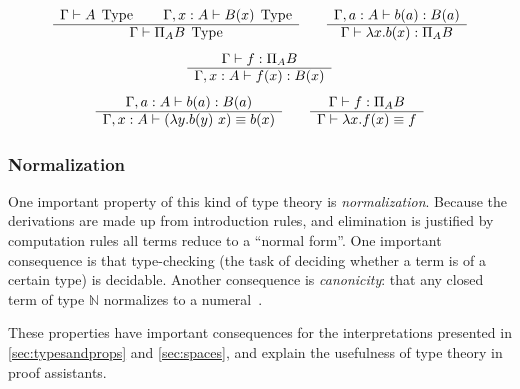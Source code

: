 \begin{equation*}
  \begin{array}[t]{c}
    \Gamma \vdash A \; \operatorname{Type} \qquad \Gamma, x:A \vdash B(x) \; \operatorname{Type}\\
    \hline
    \Gamma \vdash \Pi_A B \; \operatorname{Type}\\
  \end{array}
\qquad
  \begin{array}[t]{c}
    \Gamma, a:A \vdash b(a) : B(a)\\
    \hline
    \Gamma \vdash \lambda x.b(x) : \Pi_A B
  \end{array}
\end{equation*}
\begin{equation*}
  \begin{array}[t]{c}
    \Gamma \vdash f : \Pi_A B \\
    \hline
    \Gamma, x:A \vdash f(x) : B(x)
  \end{array}
\end{equation*}
\begin{equation*}
  \begin{array}[t]{c}
    \Gamma, a:A \vdash b(a) : B(a)\\
    \hline
    \Gamma, x:A \vdash (\lambda y.b(y)~x) \equiv b(x)
  \end{array}
  \qquad
  \begin{array}[t]{c}
    \Gamma \vdash f : \Pi_A B \\
    \hline
    \Gamma \vdash \lambda x.f(x) \equiv f
  \end{array}
\end{equation*}

\subsubsection{Normalization}
One important property of this kind of type theory is
\emph{normalization}. Because the derivations are made up from introduction
rules, and elimination is justified by computation rules all terms reduce to a
``normal form''. One important consequence is that type-checking (the task of
deciding whether a term is of a certain type) is decidable. Another consequence
is \emph{canonicity}: that any closed term of type $\mathbb{N}$ normalizes to a
numeral~\cite{hottbook}.

These properties have important consequences for the interpretations presented
in \autoref{sec:typesandprops} and \autoref{sec:spaces}, and explain the
usefulness of type theory in proof assistants.